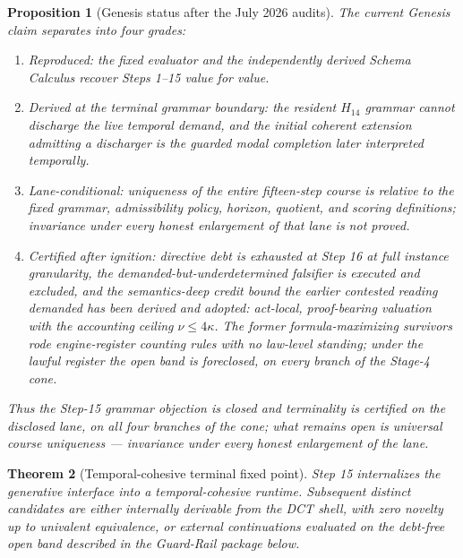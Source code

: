 \documentclass[11pt]{article}
\theoremstyle{plain}
\newtheorem{theorem}{Theorem}[section]
\newtheorem{proposition}[theorem]{Proposition}
\theoremstyle{definition}
\theoremstyle{remark}
\begin{document}
\begin{proposition}[Genesis status after the July 2026 audits]
The current Genesis claim separates into four grades:
\begin{enumerate}[leftmargin=*]
\item \emph{Reproduced:} the fixed evaluator and the independently derived Schema Calculus recover Steps 1--15 value for value.
\item \emph{Derived at the terminal grammar boundary:} the resident \(H_{14}\) grammar cannot discharge the live temporal demand, and the initial coherent extension admitting a discharger is the guarded modal completion later interpreted temporally.
\item \emph{Lane-conditional:} uniqueness of the entire fifteen-step course is relative to the fixed grammar, admissibility policy, horizon, quotient, and scoring definitions; invariance under every honest enlargement of that lane is not proved.
\item \emph{Certified after ignition:} directive debt is exhausted at Step 16 at full instance granularity, the demanded-but-underdetermined falsifier is executed and excluded, and the semantics-deep credit bound the earlier contested reading demanded has been derived and adopted: act-local, proof-bearing valuation with the accounting ceiling \(\nu\le4\kappa\). The former formula-maximizing survivors rode engine-register counting rules with no law-level standing; under the lawful register the open band is foreclosed, on every branch of the Stage-4 cone.
\end{enumerate}
Thus the Step-15 grammar objection is closed and terminality is certified on the disclosed lane, on all four branches of the cone; what remains open is universal course uniqueness --- invariance under every honest enlargement of the lane.
\end{proposition}

\begin{theorem}[Temporal-cohesive terminal fixed point]
Step 15 internalizes the generative interface into a temporal-cohesive runtime. Subsequent distinct candidates are either internally derivable from the DCT shell, with zero novelty up to univalent equivalence, or external continuations evaluated on the debt-free open band described in the Guard-Rail package below.
\end{theorem}
\end{document}
